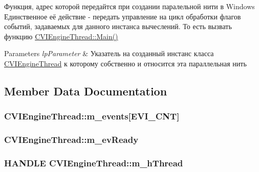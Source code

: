Функция, адрес которой передайтся при создании паралельной нити в Windows Единственное её действие -\/ передать управление на цикл обработки флагов событий, задаваемых для данного инстанса вычеслений. То есть вызвать функцию \hyperlink{class_c_v_i_engine_thread_a24ed1bd13eea28048ed010e65697e578}{C\+V\+I\+Engine\+Thread\+::\+Main()} 


\begin{DoxyParams}{Parameters}
{\em lp\+Parameter} & Указатель на созданный инстанс класса \hyperlink{class_c_v_i_engine_thread}{C\+V\+I\+Engine\+Thread} к которому собственно и относится эта параллельная нить \\
\hline
\end{DoxyParams}


\subsection{Member Data Documentation}
\hypertarget{class_c_v_i_engine_thread_a6c0ce9aab9b56cdd97087404af92fbb0}{
\subsubsection[{m\+\_\+events}]{ C\+V\+I\+Engine\+Thread\+::m\+\_\+events\mbox{[}E\+V\+I\+\_\+\+C\+N\+T\mbox{]}}}\label{class_c_v_i_engine_thread_a6c0ce9aab9b56cdd97087404af92fbb0}




\hypertarget{class_c_v_i_engine_thread_af84f80046cb905dda7623ef8a2ea956b}{
\subsubsection[{m\+\_\+ev\+Ready}]{ C\+V\+I\+Engine\+Thread\+::m\+\_\+ev\+Ready}}\label{class_c_v_i_engine_thread_af84f80046cb905dda7623ef8a2ea956b}




\hypertarget{class_c_v_i_engine_thread_a1ac54d72e0fe75fff96d82b115df962c}{
\subsubsection[{m\+\_\+h\+Thread}]{\setlength{\rightskip}{0pt plus 5cm}H\+A\+N\+D\+L\+E C\+V\+I\+Engine\+Thread\+::m\+\_\+h\+Thread}}\label{class_c_v_i_engine_thread_a1ac54d72e0fe75fff96d82b115df962c}


